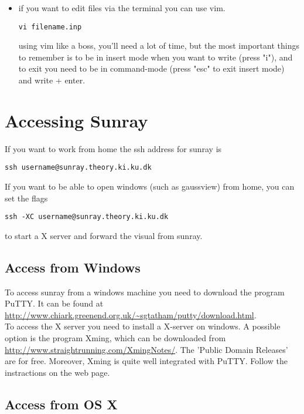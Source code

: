 \documentclass{article}
\begin{document}
\begin{itemize}
    \item {} if you want to edit files via the terminal you can use vim. 
\begin{lstlisting}
vi filename.inp
\end{lstlisting}
using vim like a boss, you'll need a lot of time, but the most important things to remember is to be in insert mode when you want to write (press "i"), and to exit you need to be in command-mode (press "esc" to exit insert mode) and write  + enter.

\end{itemize}

\newpage
\section{Accessing Sunray}

If you want to work from home the ssh address for sunray is

\begin{lstlisting}
ssh username@sunray.theory.ki.ku.dk
\end{lstlisting}

If you want to be able to open windows (such as gaussview) from home, you can set the flags

\begin{lstlisting}
ssh -XC username@sunray.theory.ki.ku.dk
\end{lstlisting}

to start a X server and forward the visual from sunray.




\subsection{Access from Windows}

To access sunray from a windows machine you need to download the program PuTTY. It can be found at \url{http://www.chiark.greenend.org.uk/~sgtatham/putty/download.html}.\\

To access the X server you need to install a X-server on windows.
A possible option is the program Xming, which can be downloaded from \url{http://www.straightrunning.com/XmingNotes/}. The 'Public Domain Releases' are for free.
Moreover, Xming is quite well integrated with PuTTY. Follow the instractions on the web page.


\subsection{Access from OS X}
\end{document}
